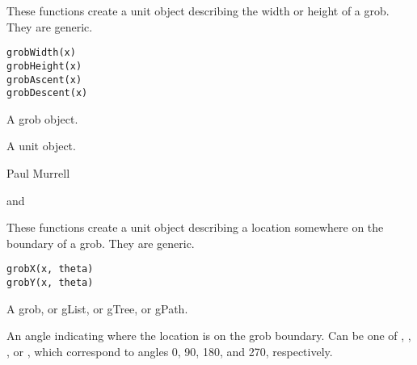 %
\begin{Description}\relax
These functions create a unit object describing the width or height of
a grob.  They are generic.
\end{Description}
%
\begin{Usage}
\begin{verbatim}
grobWidth(x)
grobHeight(x)
grobAscent(x)
grobDescent(x)
\end{verbatim}
\end{Usage}
%
\begin{Arguments}
\begin{ldescription}
\item[\code{x}] A grob object.
\end{ldescription}
\end{Arguments}
%
\begin{Value}
A unit object. 
\end{Value}
%
\begin{Author}\relax
Paul Murrell
\end{Author}
%
\begin{SeeAlso}\relax
{} and
\end{SeeAlso}
%
\begin{Description}\relax
These functions create a unit object describing a location somewhere
on the boundary of
a grob.  They are generic.
\end{Description}
%
\begin{Usage}
\begin{verbatim}
grobX(x, theta)
grobY(x, theta)
\end{verbatim}
\end{Usage}
%
\begin{Arguments}
\begin{ldescription}
\item[\code{x}] A grob, or gList, or gTree, or gPath.
\item[\code{theta}] An angle indicating where the location is
on the grob boundary.  Can be one of ,
, , or ,
which correspond to angles 0, 90, 180, and 270,
respectively.
\end{ldescription}
\end{Arguments}
%
